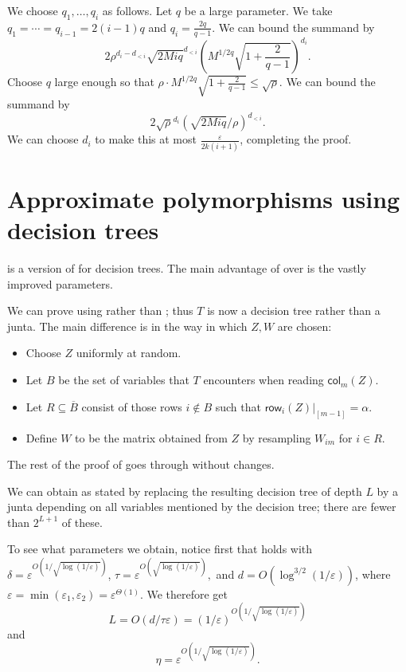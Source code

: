 \documentclass{article}
\theoremstyle{definition}
\theoremstyle{remark}
\providecommand{\row}{\mathsf{row}}
\providecommand{\col}{\mathsf{col}}
\newcommand\eps{\varepsilon}
\renewcommand\epsilon{\eps}
\renewcommand\leq{\leqslant}
\begin{document}
We choose $q_1,\ldots,q_i$ as follows. Let $q$ be a large parameter. We take $q_1 = \cdots = q_{i-1} = 2(i-1)q$ and $q_i = \frac{2q}{q-1}$. We can bound the summand by
\[
 2\rho^{d_i - d_{<i}} \sqrt{2Miq}^{d_{<i}} \left(M^{1/2q} \sqrt{1+\frac{2}{q-1}}\right)^{d_i}.
\]
Choose $q$ large enough so that $\rho \cdot M^{1/2q} \sqrt{1+\frac{2}{q-1}} \leq \sqrt{\rho}$. We can bound the summand by
\[
 2\sqrt{\rho}^{d_i} (\sqrt{2Miq}/\rho)^{d_{<i}}.
\]
We can choose $d_i$ to make this at most $\frac{\epsilon}{2k(i+1)}$, completing the proof.

\section{Approximate polymorphisms using decision trees}
\label{apx:decision-trees}

 is a version of  for decision trees. The main advantage of  over  is the vastly improved parameters.

We can prove  using  rather than ; thus $T$ is now a decision tree rather than a junta. The main difference is in the way in which $Z,W$ are chosen:

\begin{itemize}
    \item Choose $Z$ uniformly at random.
    \item Let $B$ be the set of variables that $T$ encounters when reading $\col_m(Z)$.
    \item Let $R \subseteq \overline{B}$ consist of those rows $i \notin B$ such that $\row_i(Z)|_{[m-1]} = \alpha$.
    \item Define $W$ to be the matrix obtained from $Z$ by resampling $W_{im}$ for $i \in R$.
\end{itemize}
The rest of the proof of  goes through without changes.

We can obtain  as stated by replacing the resulting decision tree of depth $L$ by a junta depending on all variables mentioned by the decision tree; there are fewer than $2^{L+1}$ of these.

To see what parameters we obtain, notice first that  holds with $\delta = \epsilon^{O(1/\sqrt{\log(1/\epsilon)})}$, $\tau = \epsilon^{O(\sqrt{\log(1/\epsilon)})},$ and $d = O(\log^{3/2}(1/\epsilon))$, where $\epsilon = \min(\epsilon_1,\epsilon_2) = \epsilon^{\Theta(1)}$. We therefore get
\[
 L = O(d/\tau \epsilon) = (1/\epsilon)^{O(1/\sqrt{\log(1/\epsilon)})}
\]
and
\[
 \eta = \epsilon^{O(1/\sqrt{\log(1/\epsilon)})}.
\]
\end{document}
